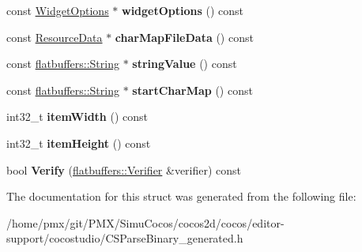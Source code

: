 \begin{DoxyCompactItemize}
const \hyperlink{structflatbuffers_1_1WidgetOptions}{Widget\+Options} $\ast$ {\bfseries widget\+Options} () const
\item 
\mbox{\label{structflatbuffers_1_1TextAtlasOptions_a3d447610a8a3b5c88e2371691ffbbf51}} 
const \hyperlink{structflatbuffers_1_1ResourceData}{Resource\+Data} $\ast$ {\bfseries char\+Map\+File\+Data} () const
\item 
\mbox{\label{structflatbuffers_1_1TextAtlasOptions_a49b9bf71eb1d9572b9b5ad090a9fb6fe}} 
const \hyperlink{structflatbuffers_1_1String}{flatbuffers\+::\+String} $\ast$ {\bfseries string\+Value} () const
\item 
\mbox{\label{structflatbuffers_1_1TextAtlasOptions_a3f393fbdc7b570088818605c4bb25401}} 
const \hyperlink{structflatbuffers_1_1String}{flatbuffers\+::\+String} $\ast$ {\bfseries start\+Char\+Map} () const
\item 
\mbox{\label{structflatbuffers_1_1TextAtlasOptions_a97a1e8a9346580acc079b5d6c8a00818}} 
int32\+\_\+t {\bfseries item\+Width} () const
\item 
\mbox{\label{structflatbuffers_1_1TextAtlasOptions_aac9053e3b5555e4d48b7f09093458e2d}} 
int32\+\_\+t {\bfseries item\+Height} () const
\item 
\mbox{\label{structflatbuffers_1_1TextAtlasOptions_ae0afa4d4dbbf193f3542b2266a884499}} 
bool {\bfseries Verify} (\hyperlink{classflatbuffers_1_1Verifier}{flatbuffers\+::\+Verifier} \&verifier) const
\end{DoxyCompactItemize}


The documentation for this struct was generated from the following file\+:\begin{DoxyCompactItemize}
\item 
/home/pmx/git/\+P\+M\+X/\+Simu\+Cocos/cocos2d/cocos/editor-\/support/cocostudio/C\+S\+Parse\+Binary\+\_\+generated.\+h\end{DoxyCompactItemize}
